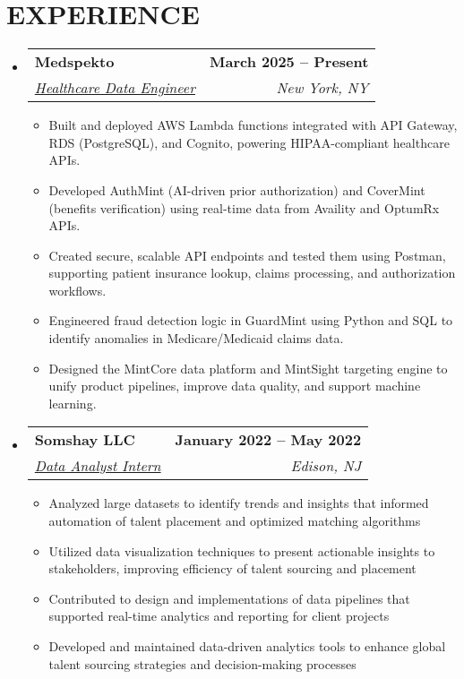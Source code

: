 \documentclass[letterpaper,11pt]{article}
\makeatletter
\newcommand{\resumeItem}[1]{
  \item\small{
    {#1 \vspace{-2pt}}
  }
}
\newcommand{\resumeSubheading}[4]{
  \vspace{-2pt}\item
    \begin{tabular*}{1.0\textwidth}[t]{l@{\extracolsep{\fill}}r}
      \textbf{\large#1} & \textbf{\small #2} \\
      \textit{\large#3} & \textit{\small #4} \\   
    \end{tabular*}\vspace{-7pt}
}
\newcommand{\resumeSubHeadingListStart}{\begin{itemize}[leftmargin=0.0in, label={}]}
\newcommand{\resumeSubHeadingListEnd}{\end{itemize}}
\newcommand{\resumeItemListStart}{\begin{itemize}}
\newcommand{\resumeItemListEnd}{\end{itemize}\vspace{-5pt}}
\makeatother
\begin{document}
\section{EXPERIENCE}
  \resumeSubHeadingListStart
      \resumeSubheading
      {Medspekto}{March 2025 -- Present} 
      {\underline{Healthcare Data Engineer}}{New York, NY}
      \vspace{1pt}
      \resumeItemListStart
        \resumeItem{\normalsize{Built and deployed AWS Lambda functions integrated with API Gateway, RDS (PostgreSQL), and Cognito, powering HIPAA-compliant healthcare APIs.}}
        \resumeItem{\normalsize{Developed AuthMint (AI-driven prior authorization) and CoverMint (benefits verification) using real-time data from Availity and OptumRx APIs.}}
        \resumeItem{\normalsize{Created secure, scalable API endpoints and tested them using Postman, supporting patient insurance lookup, claims processing, and authorization workflows.}}
        \resumeItem{\normalsize{Engineered fraud detection logic in GuardMint using Python and SQL to identify anomalies in Medicare/Medicaid claims data.}}
        \resumeItem{\normalsize{Designed the MintCore data platform and MintSight targeting engine to unify product pipelines, improve data quality, and support machine learning.}}
      \resumeItemListEnd
      
      \resumeSubheading
      {Somshay LLC}{January 2022 -- May 2022} 
      {\underline{Data Analyst Intern}}{Edison, NJ}
      \vspace{1pt}
      \resumeItemListStart
        \resumeItem{\normalsize{Analyzed large datasets to identify trends and insights that informed automation of talent placement and optimized matching algorithms}}
        \resumeItem{\normalsize{Utilized data visualization techniques to present actionable insights to stakeholders, improving efficiency of talent sourcing and placement}}
        \resumeItem{\normalsize{Contributed to design and implementations of data pipelines that supported real-time analytics and reporting for client projects}}
        \resumeItem{\normalsize{Developed and maintained data-driven analytics tools to enhance global talent sourcing strategies and decision-making processes}}
      \resumeItemListEnd
    \resumeSubHeadingListEnd
\vspace{-10pt}
\end{document}

